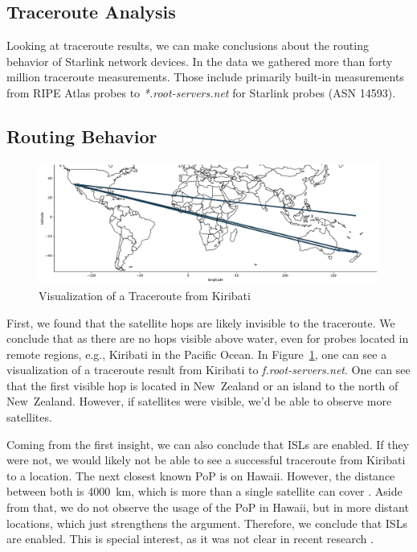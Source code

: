 
\subsection{Traceroute Analysis} \label{sec:traceroute-analysis}

Looking at traceroute results, we can make conclusions about the routing
behavior of Starlink network devices. In the data we gathered more than forty
million traceroute measurements. Those include primarily built-in measurements
from RIPE Atlas probes to \textit{*.root-servers.net} for Starlink probes
(\ac{ASN} 14593).

\subsection*{Routing Behavior}

\begin{figure}
	\includegraphics[width=\textwidth]{chapters/4-results/img/kiribati-example-traceroute.pdf}
	\caption{Visualization of a Traceroute from Kiribati}
	\label{fig:kiribati-example-traceroute}
\end{figure}

First, we found that the satellite hops are likely invisible to the traceroute.
We conclude that as there are no hops visible above water, even for probes
located in remote regions, e.g., Kiribati in the Pacific Ocean. In
Figure~\ref{fig:kiribati-example-traceroute}, one can see a visualization of a
traceroute result from Kiribati to \textit{f.root-servers.net}. One can see
that the first visible hop is located in New~Zealand or an island to the north
of New~Zealand. However, if satellites were visible, we'd be able to observe
more satellites.

Coming from the first insight, we can also conclude that \ac{ISLs} are enabled.
If they were not, we would likely not be able to see a successful traceroute
from Kiribati to a location. The next closest known \ac{PoP} is on Hawaii.
However, the distance between both is 4000~km, which is more than a single
satellite can cover \cite{Pekhterev2021}. Aside from that, we do not observe the usage of the
\ac{PoP} in Hawaii, but in more distant locations, which just strengthens the
argument. Therefore, we conclude that \ac{ISLs} are enabled. This is special
interest, as it was not clear in recent research \cite{DBLP:conf/hotnets/HauriBGS20}.

